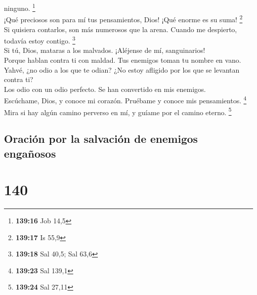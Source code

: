 ninguno. \footnote{\textbf{139:16} Job 14,5}\\
 ¡Qué preciosos son para mí tus pensamientos, Dios! ¡Qué
enorme es su suma! \footnote{\textbf{139:17} Is 55,9}\\
 Si quisiera contarlos, son más numerosos que la arena.
Cuando me despierto, todavía estoy contigo. \footnote{\textbf{139:18}
  Sal 40,5; Sal 63,6}\\
 Si tú, Dios, mataras a los malvados. ¡Aléjense de mí,
sanguinarios!\\
 Porque hablan contra ti con maldad. Tus enemigos toman
tu nombre en vano.\\
 Yahvé, ¿no odio a los que te odian? ¿No estoy afligido
por los que se levantan contra ti?\\
 Los odio con un odio perfecto. Se han convertido en mis
enemigos.\\
 Escúchame, Dios, y conoce mi corazón. Pruébame y conoce
mis pensamientos. \footnote{\textbf{139:23} Sal 139,1}\\
 Mira si hay algún camino perverso en mí, y guíame por el
camino eterno. \footnote{\textbf{139:24} Sal 27,11}

\hypertarget{oraciuxf3n-por-la-salvaciuxf3n-de-enemigos-engauxf1osos}{%
\subsection{Oración por la salvación de enemigos
engañosos}\label{oraciuxf3n-por-la-salvaciuxf3n-de-enemigos-engauxf1osos}}

\hypertarget{section-137}{%
\section{140}\label{section-137}}

